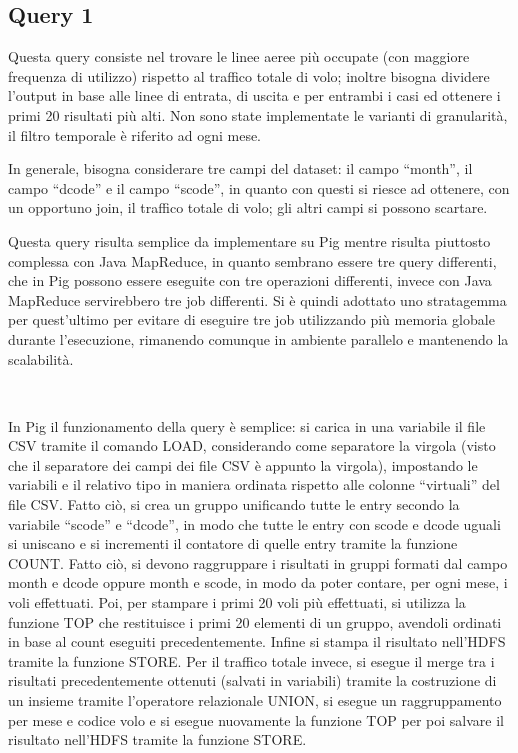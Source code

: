 \documentclass[11pt]{article} %
\begin{document}
\subsection{Query 1}

Questa query consiste nel trovare le linee aeree più occupate (con maggiore frequenza di utilizzo) rispetto al traffico totale di volo; inoltre bisogna dividere l'output in base alle linee di entrata, di uscita e per entrambi i casi ed ottenere i primi 20 risultati più alti. Non sono state implementate le varianti di granularità, il filtro temporale è riferito ad ogni mese.

In generale, bisogna considerare tre campi del dataset: il campo ``month'', il campo ``dcode'' e il campo ``scode'', in quanto con questi si riesce ad ottenere, con un opportuno join, il traffico totale di volo; gli altri campi si possono scartare.

Questa query risulta semplice da implementare su Pig mentre risulta piuttosto complessa con Java MapReduce, in quanto sembrano essere tre query differenti, che in Pig possono essere eseguite con tre operazioni differenti, invece con Java MapReduce servirebbero tre job differenti. Si è quindi adottato uno stratagemma per quest'ultimo per evitare di eseguire tre job utilizzando più memoria globale durante l'esecuzione, rimanendo comunque in ambiente parallelo e mantenendo la scalabilità.

~

In Pig il funzionamento della query è semplice: si carica in una variabile il file CSV tramite il comando LOAD, considerando come separatore la virgola (visto che il separatore dei campi dei file CSV è appunto la virgola), impostando le variabili e il relativo tipo in maniera ordinata rispetto alle colonne ``virtuali'' del file CSV. Fatto ciò, si crea un gruppo unificando tutte le entry secondo la variabile ``scode'' e ``dcode'', in modo che tutte le entry con scode e dcode uguali si uniscano e si incrementi il contatore di quelle entry tramite la funzione COUNT. Fatto ciò, si devono raggruppare i risultati in gruppi formati dal campo month e dcode oppure month e scode, in modo da poter contare, per ogni mese, i voli effettuati. Poi, per stampare i primi 20 voli più effettuati, si utilizza la funzione TOP che restituisce i primi 20 elementi di un gruppo, avendoli ordinati in base al count eseguiti precedentemente. Infine si stampa il risultato nell'HDFS tramite la funzione STORE. Per il traffico totale invece, si esegue il merge tra i risultati precedentemente ottenuti (salvati in variabili) tramite la costruzione di un insieme tramite l'operatore relazionale UNION, si esegue un raggruppamento per mese e codice volo e si esegue nuovamente la funzione TOP per poi salvare il risultato nell'HDFS tramite la funzione STORE.
\end{document}
